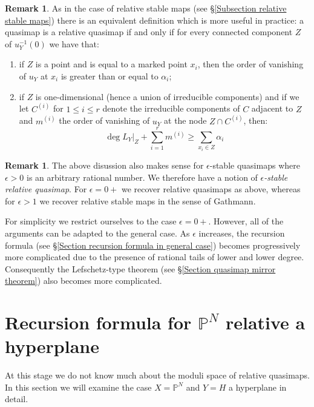 \documentclass[11pt]{amsart}
\newcommand{\PP}{\mathbb P}
\theoremstyle{definition}
\theoremstyle{definition}
\newtheorem{remark}[thm]{Remark}
\begin{document}
\begin{remark} As in the case of relative stable maps (see \S \ref{Subsection relative stable maps}) there is an equivalent definition which is more useful in practice: a quasimap is a relative quasimap if and only if for every connected component $Z$ of $u_Y^{-1}(0)$ we have that:
\begin{enumerate}
\item if $Z$ is a point and is equal to a marked point $x_i$, then the order of vanishing of $u_Y$ at $x_i$ is greater than or equal to $\alpha_i$;
\item if $Z$ is one-dimensional (hence a union of irreducible components) and if we let $C^{(i)}$ for $1 \leq i \leq r$ denote the irreducible components of $C$ adjacent to $Z$ and $m^{(i)}$ the order of vanishing of $u_Y$ at the node $Z \cap C^{(i)}$, then:
\begin{equation} \label{Relative quasimap internal component inequality} \deg L_Y|_Z + \sum_{i=1}^r m^{(i)} \geq \sum_{x_i \in Z} \alpha_i \tag{\textasteriskcentered\textasteriskcentered} \end{equation}
\end{enumerate}
\end{remark}

\begin{remark} The above disussion also makes sense for $\epsilon$-stable quasimaps where $\epsilon > 0$ is an arbitrary rational number. We therefore have a notion of \emph{$\epsilon$-stable relative quasimap}. For $\epsilon=0+$ we recover relative quasimaps as above, whereas for $\epsilon>1$ we recover relative stable maps in the sense of Gathmann.

For simplicity we restrict ourselves to the case $\epsilon=0+$. However, all of the arguments can be adapted to the general case. As $\epsilon$ increases, the recursion formula (see \S \ref{Section recursion formula in general case}) becomes progressively more complicated due to the presence of rational tails of lower and lower degree. Consequently the Lefschetz-type theorem (see \S \ref{Section quasimap mirror theorem}) also becomes more complicated.
\end{remark}

\section{Recursion formula for $\PP^N$ relative a hyperplane} \label{Section recursion for PN}
At this stage we do not know much about the moduli space of relative quasimaps. In this section we will examine the case $X=\PP^N$ and $Y=H$ a hyperplane in detail.
\end{document}
